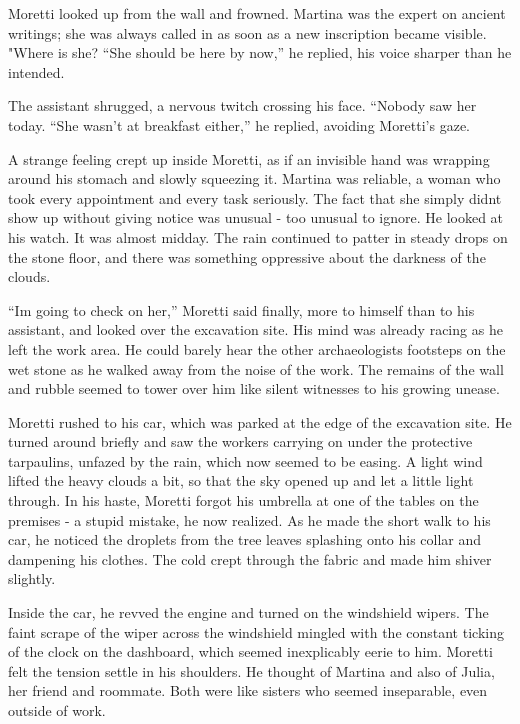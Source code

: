 \documentclass[
]{article}
\begin{document}
Moretti looked up from the wall and frowned. Martina was the expert on
ancient writings; she was always called in as soon as a new inscription
became visible. "Where is she? ``She should be here by now,'' he
replied, his voice sharper than he intended.

The assistant shrugged, a nervous twitch crossing his face. ``Nobody saw
her today. ``She wasn't at breakfast either,'' he replied, avoiding
Moretti's gaze.

A strange feeling crept up inside Moretti, as if an invisible hand was
wrapping around his stomach and slowly squeezing it. Martina was
reliable, a woman who took every appointment and every task seriously.
The fact that she simply didn\textquotesingle t show up without giving
notice was unusual - too unusual to ignore. He looked at his watch. It
was almost midday. The rain continued to patter in steady drops on the
stone floor, and there was something oppressive about the darkness of
the clouds.

``I\textquotesingle m going to check on her,'' Moretti said finally,
more to himself than to his assistant, and looked over the excavation
site. His mind was already racing as he left the work area. He could
barely hear the other archaeologists\textquotesingle{} footsteps on the
wet stone as he walked away from the noise of the work. The remains of
the wall and rubble seemed to tower over him like silent witnesses to
his growing unease.

Moretti rushed to his car, which was parked at the edge of the
excavation site. He turned around briefly and saw the workers carrying
on under the protective tarpaulins, unfazed by the rain, which now
seemed to be easing. A light wind lifted the heavy clouds a bit, so that
the sky opened up and let a little light through. In his haste, Moretti
forgot his umbrella at one of the tables on the premises - a stupid
mistake, he now realized. As he made the short walk to his car, he
noticed the droplets from the tree leaves splashing onto his collar and
dampening his clothes. The cold crept through the fabric and made him
shiver slightly.

Inside the car, he revved the engine and turned on the windshield
wipers. The faint scrape of the wiper across the windshield mingled with
the constant ticking of the clock on the dashboard, which seemed
inexplicably eerie to him. Moretti felt the tension settle in his
shoulders. He thought of Martina and also of Julia, her friend and
roommate. Both were like sisters who seemed inseparable, even outside of
work.
\end{document}
